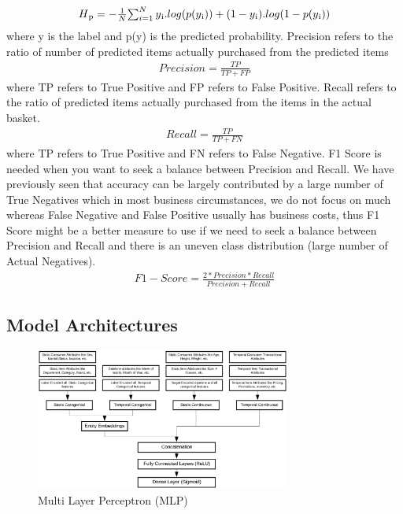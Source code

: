   \begin{equation}
      \begin{array}{l}
        H\textsubscript{p} = - \frac{1}{N}$$\sum_{i=1}^{N}y\textsubscript{i}.log(p(y\textsubscript{i}))+
        (1- y\textsubscript{i}).log(1-p(y\textsubscript{i}))
      \end{array}
    \label{eqn:logloss}
  \end{equation}
where y is the label and p(y) is the predicted probability.
Precision refers to the ratio of number of predicted items actually purchased from the predicted items
  \begin{equation}
      \begin{array}{l}
        Precision = \frac{TP} {TP + FP}
      \end{array}
    \label{eqn:Precision}
  \end{equation}
where TP refers to True Positive and FP refers to False Positive.
Recall refers to the ratio of predicted items actually purchased from the items in the actual basket. 
  \begin{equation}
      \begin{array}{l}
        Recall = \frac{TP} {TP + FN}
        \end{array}
    \label{eqn:Recall}
  \end{equation}
where TP refers to True Positive and FN refers to False Negative.
F1 Score is needed when you want to seek a balance between Precision and Recall.
We have previously seen that accuracy can be largely contributed by a large number of True Negatives which 
in most business circumstances, we do not focus on much whereas False Negative and False Positive usually has 
business costs, thus F1 Score might be a better measure to use if we need to seek a balance
between Precision and Recall and there is an uneven class distribution (large number of Actual Negatives).
  \begin{equation}
      \begin{array}{l}
        F1-Score = \frac{2 * Precision * Recall} {Precision + Recall}
      \end{array}
    \label{eqn:F1}
  \end{equation}

\subsection{Model Architectures}

  \begin{figure}[t]
    \centering 
    \includegraphics[width=3.3in]{img/MLP.png} 
    \caption{Multi Layer Perceptron (MLP)} 
    \label{fig:MLP} 
  \end{figure}

